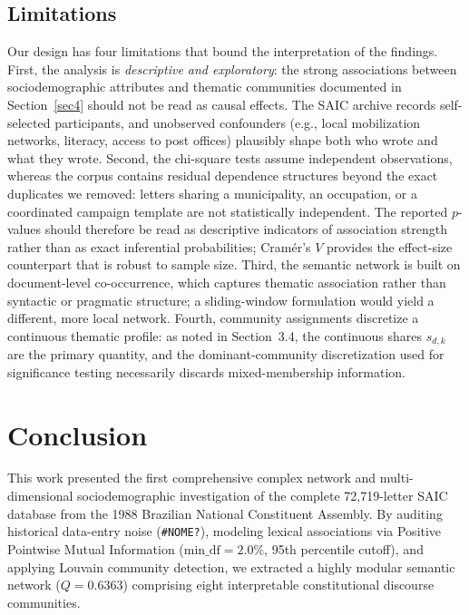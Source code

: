 \documentclass[pdflatex,sn-basic]{sn-jnl}
\begin{document}
\subsection{Limitations}\label{sec:limitations}
Our design has four limitations that bound the interpretation of the findings. First, the analysis is \emph{descriptive and exploratory}: the strong associations between sociodemographic attributes and thematic communities documented in Section~\ref{sec4} should not be read as causal effects. The SAIC archive records self-selected participants, and unobserved confounders (e.g., local mobilization networks, literacy, access to post offices) plausibly shape both who wrote and what they wrote. Second, the chi-square tests assume independent observations, whereas the corpus contains residual dependence structures beyond the exact duplicates we removed: letters sharing a municipality, an occupation, or a coordinated campaign template are not statistically independent. The reported $p$-values should therefore be read as descriptive indicators of association strength rather than as exact inferential probabilities; Cram\'{e}r's $V$ provides the effect-size counterpart that is robust to sample size. Third, the semantic network is built on document-level co-occurrence, which captures thematic association rather than syntactic or pragmatic structure; a sliding-window formulation would yield a different, more local network. Fourth, community assignments discretize a continuous thematic profile: as noted in Section~3.4, the continuous shares $s_{d,k}$ are the primary quantity, and the dominant-community discretization used for significance testing necessarily discards mixed-membership information.

\section{Conclusion}\label{sec5}
This work presented the first comprehensive complex network and multi-dimensional sociodemographic investigation of the complete 72,719-letter SAIC database from the 1988 Brazilian National Constituent Assembly. By auditing historical data-entry noise (\texttt{\#NOME?}), modeling lexical associations via Positive Pointwise Mutual Information ($\text{min\_df}=2.0\%$, 95th percentile cutoff), and applying Louvain community detection, we extracted a highly modular semantic network ($Q=0.6363$) comprising eight interpretable constitutional discourse communities.
\end{document}
